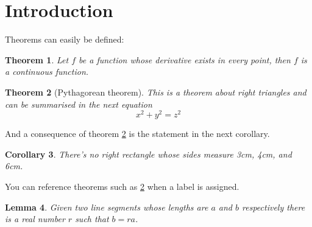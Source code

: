 \documentclass{article}
\newtheorem{theorem}{Theorem}[section]
\newtheorem{corollary}[theorem]{Corollary}
\newtheorem{lemma}[theorem]{Lemma}
\begin{document}
	\section{Introduction}
	Theorems can easily be defined:
	
	\begin{theorem}
		Let \(f\) be a function whose derivative exists in every point, then \(f\) is 
		a continuous function.
	\end{theorem}
	
	\begin{theorem}[Pythagorean theorem]
		\label{pythagorean}
		This is a theorem about right triangles and can be summarised in the next 
		equation 
		\[ x^2 + y^2 = z^2 \]
	\end{theorem}
	
	And a consequence of theorem \ref{pythagorean} is the statement in the next 
	corollary.
	
	\begin{corollary}
		There's no right rectangle whose sides measure 3cm, 4cm, and 6cm.
	\end{corollary}
	
	You can reference theorems such as \ref{pythagorean} when a label is assigned.
	
	\begin{lemma}
		Given two line segments whose lengths are \(a\) and \(b\) respectively there is a 
		real number \(r\) such that \(b=ra\).
	\end{lemma}
	
\end{document}
